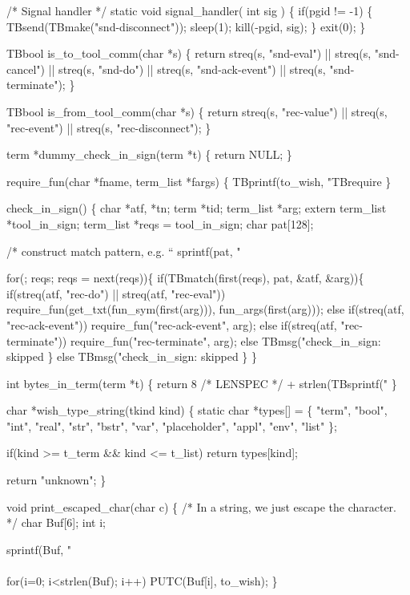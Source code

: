 /* Signal handler */
static void signal_handler( int sig )
\{
  if(pgid != -1) \{
    TBsend(TBmake("snd-disconnect"));
    sleep(1);
    kill(-pgid, sig);
  \}
  exit(0);
\}

TBbool is_to_tool_comm(char *s)
\{
  return streq(s, "snd-eval") || streq(s, "snd-cancel") || 
    streq(s, "snd-do") || streq(s, "snd-ack-event") ||
    streq(s, "snd-terminate");
\}

TBbool is_from_tool_comm(char *s)
\{
  return streq(s, "rec-value") ||  streq(s, "rec-event") || streq(s, "rec-disconnect");
\}

term *dummy_check_in_sign(term *t)
\{
  return NULL;
\}

require_fun(char *fname, term_list *fargs)
\{
  TBprintf(to_wish, "TBrequire %
\}

check_in_sign()
\{ char *atf, *tn;
  term *tid;
  term_list *arg;
  extern term_list *tool_in_sign;
  term_list *reqs = tool_in_sign;
  char pat[128];

  /* construct match pattern, e.g. ``%
  sprintf(pat, "%

  for(; reqs; reqs = next(reqs))\{
    if(TBmatch(first(reqs), pat, &atf, &arg))\{
        if(streq(atf, "rec-do") || streq(atf, "rec-eval"))
          require_fun(get_txt(fun_sym(first(arg))), fun_args(first(arg)));
        else if(streq(atf, "rec-ack-event"))
          require_fun("rec-ack-event", arg);
        else if(streq(atf, "rec-terminate"))
          require_fun("rec-terminate", arg);
        else
          TBmsg("check_in_sign: skipped %
  \} else
        TBmsg("check_in_sign: skipped %
  \}
\}

int bytes_in_term(term *t)
\{
  return 8 /* LENSPEC */ + strlen(TBsprintf("%
\}

char *wish_type_string(tkind kind)
\{
  static char *types[] =
    \{ "term", "bool", "int", "real", "str", "bstr", "var",
      "placeholder", "appl", "env", "list"
    \};

  if(kind >= t_term && kind <= t_list)
    return types[kind];

  return "unknown";
\}

void print_escaped_char(char c)
\{
  /* In a string, we just escape the character. */
  char Buf[6];
  int i;
  
  sprintf(Buf, "\\\\%
  for(i=0; i<strlen(Buf); i++)
    PUTC(Buf[i], to_wish);
\}

